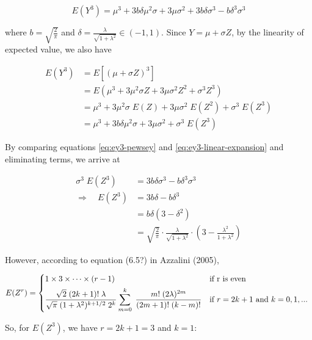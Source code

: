 \documentclass{article}
\begin{document}
\begin{equation} \label{eq:ey3-pewsey}
  E(Y^3) = \mu^3 + 3 b \delta \mu^2 \sigma + 3 \mu \sigma^2 + 3 b \delta \sigma^3 - b \delta^3 \sigma^3
\end{equation}

where $b = \sqrt{\frac{2}{\pi}}$ and $\delta = \frac{\lambda}{\sqrt{1 +
\lambda^2}} \in (-1, 1)$. Since $Y = \mu + \sigma Z$, by the linearity of
expected value, we also have

\begin{align}
  E(Y^3) &= E \left[ (\mu + \sigma Z)^3 \right] \nonumber \\
  &= E (\mu^3 + 3 \mu^2 \sigma Z + 3 \mu \sigma^2 Z^2 + \sigma^3 Z^3) \nonumber \\
  &= \mu^3 + 3 \mu^2 \sigma\;E(Z) + 3 \mu \sigma^2\;E(Z^2) + \sigma^3\;E(Z^3) \nonumber \\
  &= \mu^3 + 3 b \delta \mu^2 \sigma + 3 \mu \sigma^2 + \sigma^3\;E(Z^3) \label{eq:ey3-linear-expansion}
\end{align}

By comparing equations \eqref{eq:ey3-pewsey} and
\eqref{eq:ey3-linear-expansion} and eliminating terms, we arrive at

\begin{align}
  \sigma^3\;E(Z^3) &= 3 b \delta \sigma^3 - b \delta^3 \sigma^3 \nonumber \\
  \Rightarrow \quad E(Z^3) &= 3 b \delta - b \delta^3 \nonumber \\
  &= b \delta (3 - \delta^2) \nonumber \\
  &= \sqrt{\frac{2}{\pi}} \cdot \frac{\lambda}{\sqrt{1 + \lambda^2}} \cdot \left( 3 - \frac{\lambda^2}{1 + \lambda^2} \right) \label{eq:ez3-pewsey-derived}
\end{align}

However, according to equation (6.5?) in Azzalini (2005),

\begin{equation}
  E(Z^r) =
  \begin{dcases*}
    1 \times 3 \times \cdots \times (r -1) & if r is even \\
    \frac{\sqrt{2}\;(2k + 1)!\;\lambda}{\sqrt{\pi}\;(1 + \lambda^2)^{k + 1/2}\;2^k} \sum_{m=0}^k\;\frac{m!\;(2\lambda)^{2m}}{(2m+1)!\;(k-m)!} & if $r = 2k+1$ and $k = 0, 1, ...$
  \end{dcases*}
\end{equation}

So, for $E(Z^3)$, we have $r = 2k + 1 = 3$ and $k = 1$:
\end{document}
